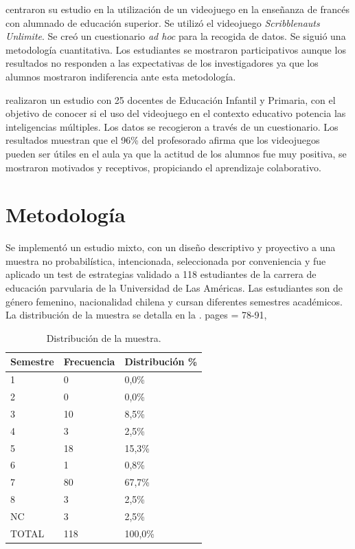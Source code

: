 \documentclass{textolivre}
\begin{document}
\textcite{brazomillan2018} %
centraron su estudio en la utilización de un videojuego en la enseñanza de francés con alumnado de educación superior. Se utilizó el videojuego \emph{Scribblenauts Unlimite}. Se creó un cuestionario \emph{ad hoc} para la recogida de datos. Se siguió una metodología cuantitativa. Los estudiantes se mostraron participativos aunque los resultados no responden a las expectativas de los investigadores ya que los alumnos mostraron indiferencia ante esta metodología.

\textcite{delmoral2015} %
realizaron un estudio con 25 docentes de Educación Infantil y Primaria, con el objetivo de conocer si el uso del videojuego en el contexto educativo potencia las inteligencias múltiples.  Los datos se recogieron a través de un cuestionario. Los resultados muestran que el 96\% del profesorado afirma que los videojuegos pueden ser útiles en el aula ya que la actitud de los alumnos fue muy positiva, se mostraron motivados y receptivos, propiciando el aprendizaje colaborativo.

\section{Metodología}

Se implementó un estudio mixto, con un diseño descriptivo y proyectivo a una muestra no probabilística, intencionada, seleccionada por conveniencia y fue aplicado un test de estrategias validado \cite{araneda2019, aravenagaete2020} %
a 118 estudiantes de la  carrera de educación parvularia de la Universidad de Las Américas. Las estudiantes son de género femenino, nacionalidad chilena y cursan diferentes semestres académicos. La distribución de la muestra se detalla en la .
	pages        = {78-91},


\begin{table}[htpb]
\centering
\caption{Distribución de la muestra.}
\label{tab2}
\begin{tabular}{lll}
\toprule 
Semestre & Frecuencia & Distribución \% \\ 
\midrule
1                 & 0                & 0,0\%
\\ 
2                 & 0                & 0,0\% 
\\ 
3                 & 10               & 8,5\%
\\
4                 & 3                & 2,5\%
\\
5                 & 18               & 15,3\%
\\
6                 & 1                & 0,8\%
\\
7                 & 80               & 67,7\%
\\
8                 & 3                & 2,5\%
\\
NC                & 3                & 2,5\%
\\
\midrule
TOTAL             & 118              & 100,0\%
\\
\bottomrule
\end{tabular}
\end{table}
\end{document}
